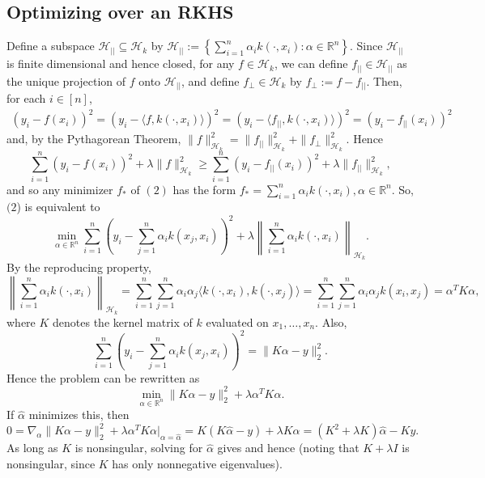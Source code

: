 \documentclass[11pt]{article}
\newcommand{\inv}{^{-1}}
\renewcommand{\H}{\mathcal{H}}
\newcommand{\R}{\mathbb{R}} %
\begin{document}
\subsection{Optimizing over an RKHS}
Define a subspace $\H_{||} \subseteq \H_k$ by
$\H_{||} := \left\{ \sum_{i = 1}^n \alpha_i k(\cdot, x_i)
                                                    : \alpha \in \R^n \right\}
$. Since $\H_{||}$ is finite dimensional and hence closed, for any
$f \in \H_k$, we can define $f_{||} \in \H_{||}$ as the unique projection of
$f$ onto $\H_{||}$, and define $f_\perp \in \H_k$ by $f_\perp := f - f_{||}$.
Then, for each $i \in [n]$,
\begin{align*}
(y_i - f(x_i))^2
    = (y_i - \langle f, k(\cdot,x_i) \rangle)^2
    = (y_i - \langle f_{||}, k(\cdot,x_i) \rangle)^2
    = (y_i - f_{||}(x_i))^2
\end{align*}
and, by the Pythagorean Theorem,
$\|f\|_{\H_k}^2 = \|f_{||}\|_{\H_k}^2 + \|f_\perp\|_{\H_k}^2$. Hence
\[\sum_{i = 1}^n (y_i - f(x_i))^2 + \lambda\|f\|_{\H_k}^2
    \geq \sum_{i = 1}^n (y_i - f_{||}(x_i))^2 + \lambda\|f_{||}\|_{\H_k}^2,
\]
and so any minimizer $f_*$ of $(2)$ has the form
$f_* = \sum_{i = 1}^n \alpha_i k(\cdot,x_i), \alpha \in \R^n$. So, $(2$) is
equivalent to
\begin{equation*}
\min_{\alpha \in \R^n}
    \sum_{i = 1}^n
        \left( y_i - \sum_{j = 1}^n \alpha_i k(x_j,x_i) \right)^2
    + \lambda\left\|\sum_{i = 1}^n \alpha_i k(\cdot, x_i) \right\|_{\H_k}.
\end{equation*}
By the reproducing property,
\[\left\|\sum_{i = 1}^n \alpha_i k(\cdot, x_i) \right\|_{\H_k}
    = \sum_{i = 1}^n \sum_{j = 1}^n \alpha_i\alpha_j
                                    \langle k(\cdot,x_i), k(\cdot,x_j) \rangle
    = \sum_{i = 1}^n \sum_{j = 1}^n \alpha_i\alpha_j k(x_i,x_j)
    = \alpha^T K \alpha,
\]
where $K$ denotes the kernel matrix of $k$ evaluated on $x_1,\dots,x_n$. Also,
\[\sum_{i = 1}^n \left( y_i - \sum_{j = 1}^n \alpha_i k(x_j,x_i) \right)^2
    = \|K\alpha - y\|_2^2.
\]
Hence the problem can be rewritten as
\[\min_{\alpha \in \R^n} \|K\alpha - y\|_2^2 + \lambda\alpha^T K \alpha.\]
If $\hat\alpha$ minimizes this, then
\[0
    = \nabla_\alpha \|K\alpha - y\|_2^2
                        + \lambda\alpha^T K \alpha \big|_{\alpha = \hat\alpha}
    = K(K\hat\alpha - y) + \lambda K \alpha
    = (K^2 + \lambda K) \hat\alpha - Ky.
\]
As long as $K$ is nonsingular, solving for $\hat\alpha$ gives and hence
\fbox{$\hat\alpha = (K + \lambda I)\inv y$} (noting that $K + \lambda I$ is
nonsingular, since $K$ has only nonnegative eigenvalues).
\end{document}
